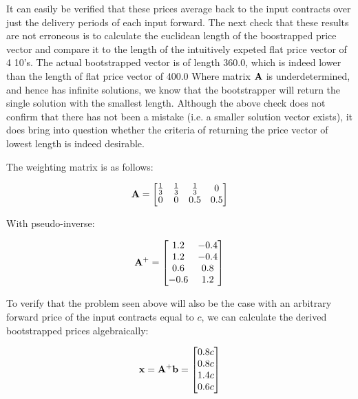 \documentclass{article}
\begin{document}
It can easily be verified that these prices average back to the input contracts
over just the delivery periods of each input forward. The next check
that these results are not erroneous is to calculate the euclidean length of
the boostrapped price vector and compare it to the length of the intuitively 
expeted flat price vector of 4 10's. The actual bootstrapped vector is of length 360.0, 
which is indeed lower than the length of flat price vector of 400.0 Where matrix
$\mathbf{A}$ is underdetermined, and hence has infinite solutions, we know that the 
bootstrapper will return the single solution with the smallest length. Although
the above check does not confirm that there has not been a mistake (i.e. a smaller
solution vector exists), it does bring into question whether the criteria of 
returning the price vector of lowest length is indeed desirable.


The weighting matrix is as follows:

\begin{equation}
    \mathbf{A} = \begin{bmatrix}
        \frac{1}{3} & \frac{1}{3} & \frac{1}{3} & 0 \\
        0 & 0 & 0.5 & 0.5
    \end{bmatrix}
\end{equation}

With pseudo-inverse:

\begin{equation}
    \mathbf{A}^+ = \begin{bmatrix}
        1.2 & -0.4 \\
        1.2 & -0.4 \\
        0.6 & 0.8 \\
        -0.6 & 1.2 \\
    \end{bmatrix}
\end{equation}

To verify that the problem seen above will also be the case with an arbitrary forward
price of the input contracts equal to $c$, we can calculate the derived bootstrapped 
prices algebraically:

\begin{equation}
    \mathbf{x} = \mathbf{A}^+ \mathbf{b} = \begin{bmatrix}
            0.8c \\
            0.8c \\
            1.4c \\
            0.6c \\
        \end{bmatrix}
\end{equation}
\end{document}
